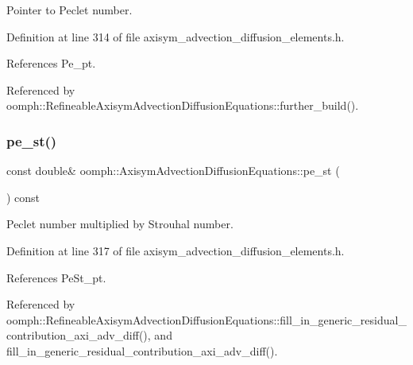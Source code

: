 Pointer to Peclet number. 



Definition at line 314 of file axisym\+\_\+advection\+\_\+diffusion\+\_\+elements.\+h.



References Pe\+\_\+pt.



Referenced by oomph\+::\+Refineable\+Axisym\+Advection\+Diffusion\+Equations\+::further\+\_\+build().

\mbox{\label{classoomph_1_1AxisymAdvectionDiffusionEquations_af1431215d3df6c1299e0e3f34504b423}} 
\subsubsection{\texorpdfstring{pe\+\_\+st()}{pe\_st()}}
{\footnotesize\ttfamily const double\& oomph\+::\+Axisym\+Advection\+Diffusion\+Equations\+::pe\+\_\+st (\begin{DoxyParamCaption}{ }\end{DoxyParamCaption}) const\hspace{0.3cm}{\ttfamily [inline]}}



Peclet number multiplied by Strouhal number. 



Definition at line 317 of file axisym\+\_\+advection\+\_\+diffusion\+\_\+elements.\+h.



References Pe\+St\+\_\+pt.



Referenced by oomph\+::\+Refineable\+Axisym\+Advection\+Diffusion\+Equations\+::fill\+\_\+in\+\_\+generic\+\_\+residual\+\_\+contribution\+\_\+axi\+\_\+adv\+\_\+diff(), and fill\+\_\+in\+\_\+generic\+\_\+residual\+\_\+contribution\+\_\+axi\+\_\+adv\+\_\+diff().

\mbox{\label{classoomph_1_1AxisymAdvectionDiffusionEquations_aaa4a657d824e300f7509f5f0f954c30f}} 
